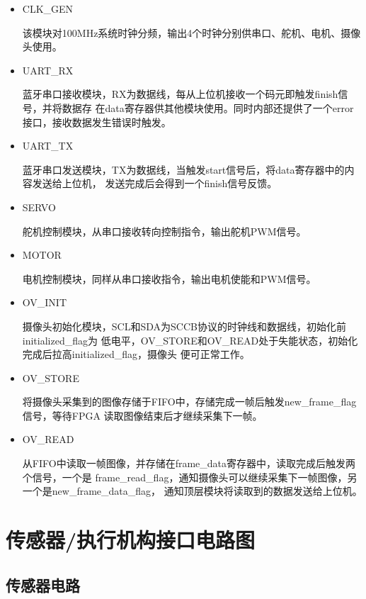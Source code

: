 \documentclass[a4paper]{paper}
\begin{document}
\begin{itemize}
    \item CLK\_GEN

    该模块对100MHz系统时钟分频，输出4个时钟分别供串口、舵机、电机、摄像头使用。

    \item UART\_RX

    蓝牙串口接收模块，RX为数据线，每从上位机接收一个码元即触发finish信号，并将数据存
    在data寄存器供其他模块使用。同时内部还提供了一个error接口，接收数据发生错误时触发。

    \item UART\_TX

    蓝牙串口发送模块，TX为数据线，当触发start信号后，将data寄存器中的内容发送给上位机，
    发送完成后会得到一个finish信号反馈。

    \item SERVO

    舵机控制模块，从串口接收转向控制指令，输出舵机PWM信号。

    \item MOTOR

    电机控制模块，同样从串口接收指令，输出电机使能和PWM信号。

    \item OV\_INIT

    摄像头初始化模块，SCL和SDA为SCCB协议的时钟线和数据线，初始化前initialized\_flag为
    低电平，OV\_STORE和OV\_READ处于失能状态，初始化完成后拉高initialized\_flag，摄像头
    便可正常工作。

    \item OV\_STORE

    将摄像头采集到的图像存储于FIFO中，存储完成一帧后触发new\_frame\_flag信号，等待FPGA
    读取图像结束后才继续采集下一帧。

    \item OV\_READ

    从FIFO中读取一帧图像，并存储在frame\_data寄存器中，读取完成后触发两个信号，一个是
    frame\_read\_flag，通知摄像头可以继续采集下一帧图像，另一个是new\_frame\_data\_flag，
    通知顶层模块将读取到的数据发送给上位机。
    
\end{itemize}
\section{传感器/执行机构接口电路图}
\subsection{传感器电路}
\end{document}
